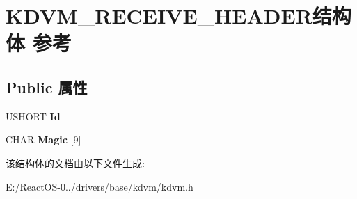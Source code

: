 \hypertarget{struct_k_d_v_m___r_e_c_e_i_v_e___h_e_a_d_e_r}{}\section{K\+D\+V\+M\+\_\+\+R\+E\+C\+E\+I\+V\+E\+\_\+\+H\+E\+A\+D\+E\+R结构体 参考}
\label{struct_k_d_v_m___r_e_c_e_i_v_e___h_e_a_d_e_r}
\subsection*{Public 属性}
\begin{DoxyCompactItemize}
\item 
\mbox{\label{struct_k_d_v_m___r_e_c_e_i_v_e___h_e_a_d_e_r_a0ec4c301cdabfd03204f6c13f4829f21}} 
U\+S\+H\+O\+RT {\bfseries Id}
\item 
\mbox{\label{struct_k_d_v_m___r_e_c_e_i_v_e___h_e_a_d_e_r_a76c001d981691b8ca6acad03db2a0a49}} 
C\+H\+AR {\bfseries Magic} \mbox{[}9\mbox{]}
\end{DoxyCompactItemize}


该结构体的文档由以下文件生成\+:\begin{DoxyCompactItemize}
\item 
E\+:/\+React\+O\+S-\/0../drivers/base/kdvm/kdvm.\+h\end{DoxyCompactItemize}
